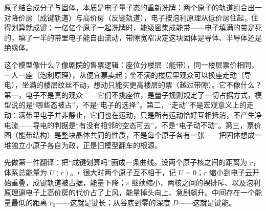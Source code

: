 
\begin{oneline}
原子结合成分子与固体，本质是电子量子态的重新洗牌：两个原子的轨道组合出一对降价房（成键轨道）与高价房（反键轨道），电子按泡利原理从低价房住起，住得划算就成键；一亿亿个原子一起洗牌时，能级密集成能带——电子填满的带是死的，填了一半的带里电子能自由流动，带隙宽窄决定这块固体是导体、半导体还是绝缘体。
\end{oneline}

这个模型像什么？像剧院的售票逻辑：座位分楼层（能带），同一楼层票价相同，一人一座（泡利原理），从便宜票卖起；坐不满的楼层里观众可以换座走动（导电），坐满的楼层纹丝不动，想动只能买更高楼层的票（越过带隙）。它不像什么？第一，电子不是真的观众——它们不挑座位，是量子规则规定了一切占据方式，模型说的是“哪些态被占”，不是“电子的选择”。第二，“走动”不是宏观意义上的走动：满带里电子并非静止，它们也在运动，只是所有运动恰好互相抵消，不产生净电流——导电的判据是“有没有相邻的空态可去”，不是“电子动不动”。第三，票价图（能带结构）是整块晶体共同的性质，不是每个原子各有一张——把固体想成一堆独立小原子各自为政，正是旧模型翻车的根源。


先做第一件翻译：把“成键划算吗”画成一条曲线。设两个原子核之间的距离为 \(r\)，体系总能量为 \(U(r)\)。\(r\) 很大时两个原子互不相干，记 \(U=0\)；\(r\) 缩小到电子云开始重叠，成键轨道被占据，能量下降；\(r\) 继续缩小，两核之间的裸排斥、以及泡利原理逼电子上高价房的代价占了上风，能量掉头向上、急剧飙升。中间存在一个能量最低的距离 \(r_0\)——这就是键长；从谷底到零的深度 \(D\)——这就是键能。

\begin{figure}[htbp]
\centering
{}
\end{figure}

